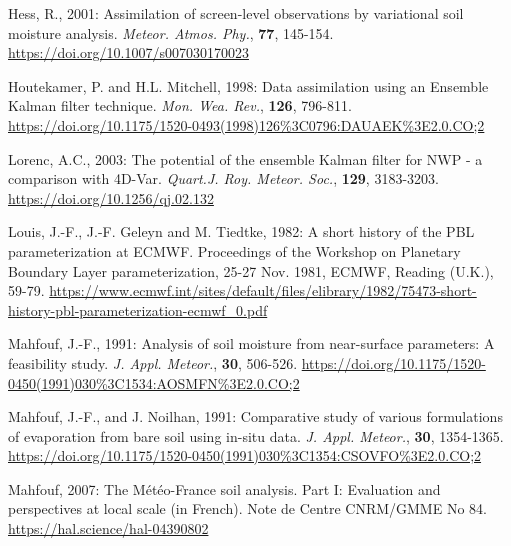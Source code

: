 \documentclass[12pt]{article}
\begin{document}
{{{\begin{description}
\item Hess, R., 2001: Assimilation of screen-level observations by
  variational soil moisture analysis. {\it Meteor. Atmos. Phy.}, {\bf 77}, 145-154.
\url{https://doi.org/10.1007/s007030170023}

\item Houtekamer, P. and H.L. Mitchell, 1998: Data assimilation
using an Ensemble Kalman filter technique.
{\it Mon. Wea. Rev.}, {\bf 126}, 796-811.
\url{https://doi.org/10.1175/1520-0493(1998)126\%3C0796:DAUAEK\%3E2.0.CO;2}

\item Lorenc, A.C., 2003: The potential of the ensemble Kalman filter for NWP - a comparison with 4D-Var. {\it Quart.J. Roy. Meteor. Soc.}, {\bf 129}, 3183-3203. \url{https://doi.org/10.1256/qj.02.132}

\item Louis, J.-F., J.-F. Geleyn and M. Tiedtke, 1982: A short history of the PBL parameterization at ECMWF. Proceedings of the Workshop on Planetary Boundary Layer parameterization, 25-27 Nov. 1981, ECMWF, Reading (U.K.), 59-79.
\url{https://www.ecmwf.int/sites/default/files/elibrary/1982/75473-short-history-pbl-parameterization-ecmwf_0.pdf}

\item Mahfouf, J.-F., 1991: Analysis of soil moisture from
  near-surface parameters: A feasibility study.
{\it J. Appl. Meteor.}, {\bf 30}, 506-526.
\url{https://doi.org/10.1175/1520-0450(1991)030\%3C1534:AOSMFN\%3E2.0.CO;2}

\item Mahfouf, J.-F., and J. Noilhan, 1991:
Comparative study of various formulations of evaporation from bare soil
using in-situ data. {\it J. Appl. Meteor.}, {\bf 30}, 1354-1365.
\url{https://doi.org/10.1175/1520-0450(1991)030\%3C1354:CSOVFO\%3E2.0.CO;2}



\item  Mahfouf, 2007: The M\'et\'eo-France soil analysis.
Part I: Evaluation and perspectives at local scale (in French).
Note de Centre CNRM/GMME No 84. 
\url{https://hal.science/hal-04390802}


\end{description}}}}
\end{document}
